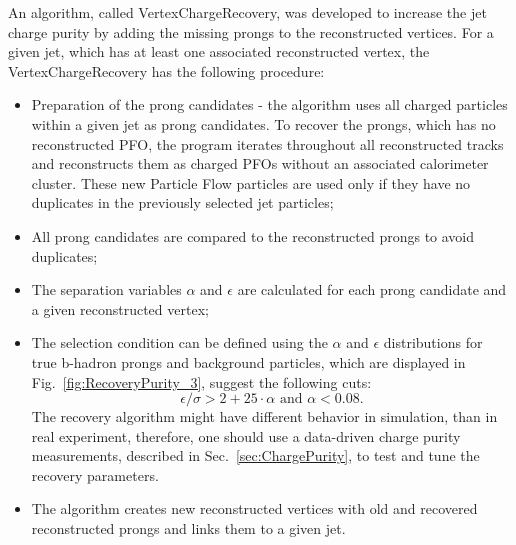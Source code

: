 An algorithm, called VertexChargeRecovery, was developed to increase the jet charge purity by adding the missing prongs to the reconstructed vertices.  For a given jet, which has at least one associated reconstructed vertex, the VertexChargeRecovery has the following procedure:

\begin{itemize}
\item Preparation of the prong candidates - the algorithm uses all charged particles within a given jet as prong candidates. To recover the prongs, which has no reconstructed PFO, the program iterates throughout all reconstructed tracks and reconstructs them as charged PFOs without an associated calorimeter cluster. These new Particle Flow particles are used only if they have no duplicates in the previously selected jet particles;
\item All prong candidates are compared to the reconstructed prongs to avoid duplicates;
\item The separation variables $\alpha$ and $\epsilon$ are calculated for each prong candidate and a given reconstructed vertex;
\item The selection condition can be defined using the $\alpha$ and $\epsilon$ distributions for true b-hadron prongs and background particles, which are displayed in Fig.~\ref{fig:RecoveryPurity_3}, suggest the following cuts:
\begin{equation}
\epsilon/\sigma > 2 + 25\cdot\alpha\text{ and } \alpha < 0.08.
\end{equation}
The recovery algorithm might have different behavior in simulation, than in real experiment, therefore, one should use a data-driven charge purity measurements, described in Sec.~\ref{sec:ChargePurity}, to test and tune the recovery parameters.
\item The algorithm creates new reconstructed vertices with old and recovered reconstructed prongs and links them to a given jet.
\end{itemize}

